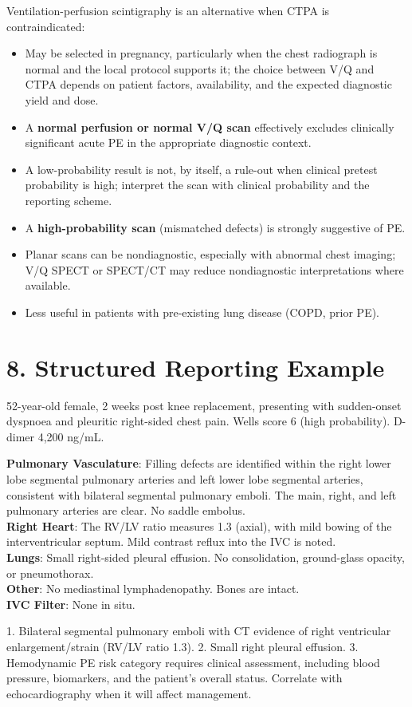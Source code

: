 Ventilation-perfusion scintigraphy is an alternative when CTPA is contraindicated:
\begin{itemize}
  \item May be selected in pregnancy, particularly when the chest radiograph is normal and the local protocol supports it; the choice between V/Q and CTPA depends on patient factors, availability, and the expected diagnostic yield and dose.
  \item A \textbf{normal perfusion or normal V/Q scan} effectively excludes clinically significant acute PE in the appropriate diagnostic context.
  \item A low-probability result is not, by itself, a rule-out when clinical pretest probability is high; interpret the scan with clinical probability and the reporting scheme.
  \item A \textbf{high-probability scan} (mismatched defects) is strongly suggestive of PE.
  \item Planar scans can be nondiagnostic, especially with abnormal chest imaging; V/Q SPECT or SPECT/CT may reduce nondiagnostic interpretations where available.
  \item Less useful in patients with pre-existing lung disease (COPD, prior PE).
\end{itemize}


\section{8. Structured Reporting Example}

\begin{testbox}[Indications:]
52-year-old female, 2 weeks post knee replacement, presenting with sudden-onset dyspnoea and pleuritic right-sided chest pain. Wells score 6 (high probability). D-dimer 4,200 ng/mL.
\end{testbox}
\begin{refbox}[Findings:]
\textbf{Pulmonary Vasculature}: Filling defects are identified within the right lower lobe segmental pulmonary arteries and left lower lobe segmental arteries, consistent with bilateral segmental pulmonary emboli. The main, right, and left pulmonary arteries are clear. No saddle embolus.\\
\textbf{Right Heart}: The RV/LV ratio measures 1.3 (axial), with mild bowing of the interventricular septum. Mild contrast reflux into the IVC is noted.\\
\textbf{Lungs}: Small right-sided pleural effusion. No consolidation, ground-glass opacity, or pneumothorax.\\
\textbf{Other}: No mediastinal lymphadenopathy. Bones are intact.\\
\textbf{IVC Filter}: None in situ.
\end{refbox}
\begin{pearlbox}[Impression:]
1. Bilateral segmental pulmonary emboli with CT evidence of right ventricular enlargement/strain (RV/LV ratio 1.3).
2. Small right pleural effusion.
3. Hemodynamic PE risk category requires clinical assessment, including blood pressure, biomarkers, and the patient's overall status. Correlate with echocardiography when it will affect management.
\end{pearlbox}

